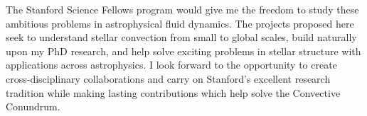 \documentclass[onecolumn, 11pt, hmargin=1in, vmargin=1in]{aastex62}
\begin{document}
The Stanford Science Fellows program would give me the freedom to study these ambitious problems in astrophysical fluid dynamics.
The projects proposed here seek to understand stellar convection from small to global scales, build naturally upon my PhD research, and help solve exciting problems in stellar structure with applications across astrophysics.
I look forward to the opportunity to create cross-disciplinary collaborations and carry on Stanford's excellent research tradition while making lasting contributions which help solve the Convective Conundrum.

\vspace{-11pt}


\end{document}
